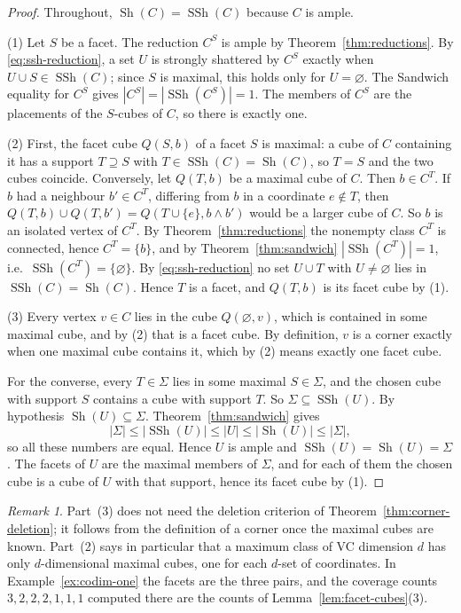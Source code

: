 \documentclass[11pt]{article}
\numberwithin{equation}{section}
\theoremstyle{definition}
\theoremstyle{remark}
\newtheorem{remark}[theorem]{Remark}
\newcommand{\Sh}{\operatorname{Sh}}
\newcommand{\SSh}{\operatorname{SSh}}
\begin{document}
\begin{proof}
Throughout, \(\Sh(C)=\SSh(C)\) because \(C\) is ample.

(1) Let \(S\) be a facet.  The reduction \(C^S\) is ample by
Theorem~\ref{thm:reductions}.  By \eqref{eq:ssh-reduction}, a set \(U\)
is strongly shattered by \(C^S\) exactly when \(U\cup S\in\SSh(C)\); since
\(S\) is maximal, this holds only for \(U=\varnothing\).  The Sandwich
equality for \(C^S\) gives \(|C^S|=|\SSh(C^S)|=1\).  The members of
\(C^S\) are the placements of the \(S\)-cubes of \(C\), so there is exactly
one.

(2) First, the facet cube \(Q(S,b)\) of a facet \(S\) is maximal: a cube of
\(C\) containing it has a support \(T\supseteq S\) with
\(T\in\SSh(C)=\Sh(C)\), so \(T=S\) and the two cubes coincide.  Conversely,
let \(Q(T,b)\) be a maximal cube of \(C\).  Then \(b\in C^T\).  If \(b\)
had a neighbour \(b'\in C^T\), differing from \(b\) in a coordinate
\(e\notin T\), then \(Q(T,b)\cup Q(T,b')=Q(T\cup\{e\},b\wedge b')\) would
be a larger cube of \(C\).  So \(b\) is an isolated vertex of \(C^T\).
By Theorem~\ref{thm:reductions} the nonempty class \(C^T\) is connected,
hence \(C^T=\{b\}\), and by Theorem~\ref{thm:sandwich}
\(|\SSh(C^T)|=1\), i.e.\ \(\SSh(C^T)=\{\varnothing\}\).  By
\eqref{eq:ssh-reduction} no set \(U\cup T\) with \(U\neq\varnothing\)
lies in \(\SSh(C)=\Sh(C)\).  Hence \(T\) is a facet, and \(Q(T,b)\) is its
facet cube by (1).

(3) Every vertex \(v\in C\) lies in the cube \(Q(\varnothing,v)\), which is
contained in some maximal cube, and by (2) that is a facet cube.  By
definition, \(v\) is a corner exactly when one maximal cube contains it,
which by (2) means exactly one facet cube.

For the converse, every \(T\in\Sigma\) lies in some maximal
\(S\in\Sigma\), and the chosen cube with support \(S\) contains a cube
with support \(T\).  So \(\Sigma\subseteq\SSh(U)\).  By hypothesis
\(\Sh(U)\subseteq\Sigma\).  Theorem~\ref{thm:sandwich} gives
\[
 |\Sigma|\le|\SSh(U)|\le|U|\le|\Sh(U)|\le|\Sigma| ,
\]
so all these numbers are equal.  Hence \(U\) is ample and
\(\SSh(U)=\Sh(U)=\Sigma\).  The facets of \(U\) are the maximal members of
\(\Sigma\), and for each of them the chosen cube is a cube of \(U\) with that
support, hence its facet cube by (1).
\end{proof}

\begin{remark}
Part~(3) does not need the deletion criterion of
Theorem~\ref{thm:corner-deletion}; it follows from the definition of a
corner once the maximal cubes are known.  Part~(2) says in particular that
a maximum class of VC dimension \(d\) has only \(d\)-dimensional maximal
cubes, one for each \(d\)-set of coordinates.  In
Example~\ref{ex:codim-one} the facets are the three pairs, and the
coverage counts \(3,2,2,2,1,1,1\) computed there are the counts of
Lemma~\ref{lem:facet-cubes}(3).
\end{remark}
\end{document}
